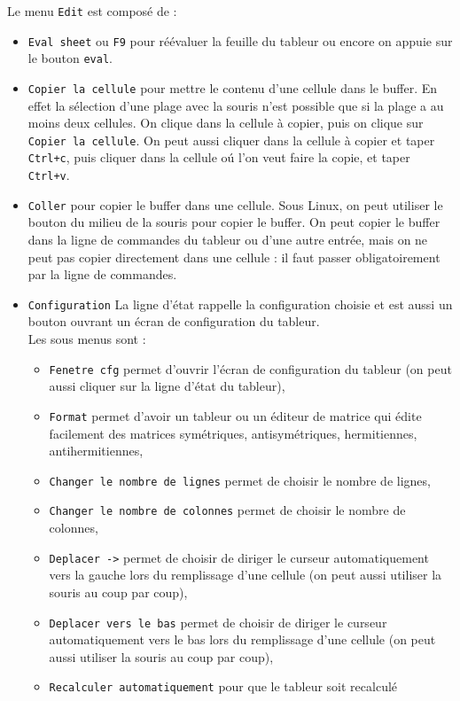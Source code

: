 \documentclass[a4paper,11pt]{article}
\begin{document}
Le menu {\tt Edit} est compos\'e de :
\begin{itemize}
\item {\tt Eval sheet} ou {\tt F9} pour r\'e\'evaluer la feuille du tableur ou
encore on appuie sur le bouton {\tt eval}.
\item {\tt Copier la cellule} pour mettre le contenu d'une cellule dans le 
buffer. En effet la s\'election d'une plage avec la souris n'est possible que 
si la plage a au moins deux cellules. On clique dans la cellule \`a copier, 
puis on clique sur {\tt Copier la cellule}. On peut aussi cliquer dans la 
cellule \`a copier et taper {\tt Ctrl+c}, puis cliquer dans la cellule o\'u 
l'on veut faire la copie, et taper {\tt Ctrl+v}. 
\item {\tt Coller} pour copier le buffer dans une cellule. Sous Linux, on peut
utiliser le bouton du milieu de la souris pour copier le buffer. On peut copier
le buffer dans la ligne de commandes du tableur ou d'une autre entr\'ee, mais 
on ne peut pas copier directement dans une cellule : il faut passer 
obligatoirement par la ligne de commandes. 
\item {\tt Configuration} 
La ligne d'\'etat rappelle la configuration choisie et est aussi un bouton 
ouvrant un \'ecran de configuration du tableur.\\
Les sous menus sont :
\begin{itemize}
\item {\tt Fenetre cfg} permet d'ouvrir l'\'ecran de configuration du tableur
(on peut aussi cliquer sur la ligne d'\'etat du tableur),
\item {\tt Format} permet d'avoir un tableur ou un \'editeur de matrice 
qui \'edite facilement des matrices sym\'etriques, antisym\'etriques,
hermitiennes, antihermitiennes,
\item {\tt Changer le nombre de lignes} permet de choisir le nombre de lignes,
\item {\tt Changer le nombre de colonnes} permet de choisir le nombre de 
colonnes,
\item {\tt Deplacer ->} permet de choisir de diriger le curseur automatiquement
vers la gauche lors du remplissage d'une cellule (on peut aussi utiliser la 
souris au coup par coup),
\item {\tt Deplacer vers le bas} permet de choisir de diriger le curseur 
automatiquement vers le bas lors du remplissage d'une cellule (on peut aussi 
utiliser la souris au coup par coup),
\item {\tt Recalculer automatiquement} pour que le tableur soit recalcul\'e

\end{itemize}
\end{itemize}
\end{document}
